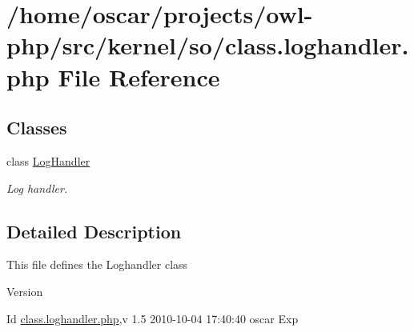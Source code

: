 \section{/home/oscar/projects/owl-\/php/src/kernel/so/class.loghandler.php File Reference}
\label{class_8loghandler_8php}
\subsection*{Classes}
\begin{DoxyCompactItemize}
\item 
class \hyperlink{classLogHandler}{LogHandler}
\begin{DoxyCompactList}\small\item\em Log handler. \item\end{DoxyCompactList}\end{DoxyCompactItemize}


\subsection{Detailed Description}
This file defines the Loghandler class \begin{DoxyVersion}{Version}

\end{DoxyVersion}
\begin{DoxyParagraph}{Id}
\hyperlink{class_8loghandler_8php}{class.loghandler.php},v 1.5 2010-\/10-\/04 17:40:40 oscar Exp 
\end{DoxyParagraph}
